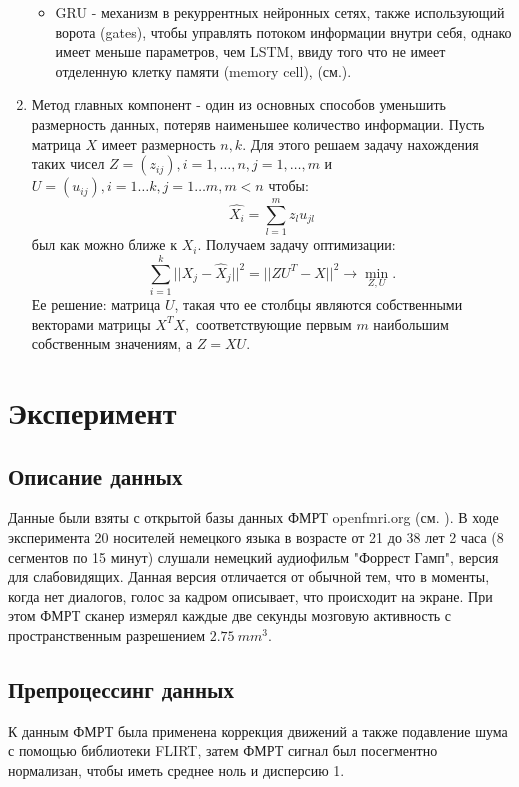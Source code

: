 \documentclass[pdftex,ptm,12pt,a4paper]{report}
\theoremstyle{definition}
\begin{document}
\begin{enumerate}
\begin{itemize}
\item GRU - механизм в рекуррентных нейронных сетях, также использующий ворота (gates), чтобы управлять потоком информации внутри себя, однако имеет меньше параметров, чем LSTM, ввиду того что не имеет отделенную клетку памяти (memory cell), (см.\cite{chung2014empirical}).
\end{itemize}

\item Метод главных компонент - один из основных способов уменьшить размерность данных, потеряв наименьшее количество информации. Пусть матрица $X$ имеет размерность $n, k.$ Для этого решаем задачу нахождения таких чисел $Z = (z_{ij}), i=1,\ldots, n, j=1,\ldots,m$ и $U = (u_{ij}), i = 1\ldots k, j=1\ldots m, m < n$ чтобы:
$$\hat{X_i} = \sum_{l=1}^{m}z_l u_{jl}$$ был как можно ближе к $X_i.$ Получаем задачу оптимизации: 
$$ \sum_{i=1}^{k} ||X_j - \hat{X}_j||^2 = || ZU^{T} - X||^2 \longrightarrow \underset{Z, U}{\operatorname{min}}.$$ Ее решение: матрица $U$, такая что ее столбцы являются собственными векторами матрицы $X^{T}X,$ соответствующие первым $m$ наибольшим собственным значениям, а $Z = XU.$
\end{enumerate}

\chapter{Эксперимент}

\section{Описание данных}

Данные были взяты с открытой базы данных ФМРТ openfmri.org (см. \citep{hanke2014high}). В ходе эксперимента 20 носителей немецкого языка в возрасте от 21 до 38 лет 2 часа (8 сегментов по 15 минут) слушали немецкий аудиофильм "Форрест Гамп", версия для слабовидящих. Данная версия отличается от обычной тем, что в моменты, когда нет диалогов, голос за кадром описывает, что происходит на экране. При этом ФМРТ сканер измерял каждые две секунды мозговую активность с пространственным разрешением $2.75\ mm^3$.

\section{Препроцессинг данных}

К данным ФМРТ была применена коррекция движений а также подавление шума с помощью библиотеки FLIRT, затем ФМРТ сигнал был посегментно нормализан, чтобы иметь среднее ноль и дисперсию 1. 
\end{document}

